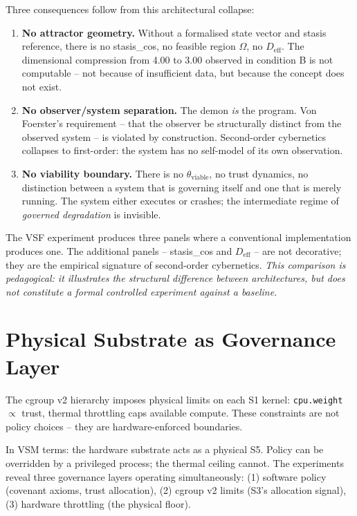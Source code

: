 \documentclass[11pt, a4paper]{article}
\begin{document}
Three consequences follow from this architectural collapse:

\begin{enumerate}
  \item \textbf{No attractor geometry.}  Without a formalised state vector and
    stasis reference, there is no stasis\_cos, no feasible region $\Omega$,
    no $D_\text{eff}$.  The dimensional compression from 4.00 to 3.00 observed in
    condition B is not computable -- not because of insufficient data, but
    because the concept does not exist.
  \item \textbf{No observer/system separation.}  The demon \emph{is} the
    program.  Von Foerster's requirement -- that the observer be structurally
    distinct from the observed system -- is violated by construction.
    Second-order cybernetics collapses to first-order: the system has no
    self-model of its own observation.
  \item \textbf{No viability boundary.}  There is no $\theta_\text{viable}$,
    no trust dynamics, no distinction between a system that is governing itself
    and one that is merely running.  The system either executes or crashes;
    the intermediate regime of \emph{governed degradation} is invisible.
\end{enumerate}

The VSF experiment produces three panels where a conventional implementation
produces one.  The additional panels -- stasis\_cos and $D_\text{eff}$ -- are not
decorative; they are the empirical signature of second-order cybernetics.
\textit{This comparison is pedagogical: it illustrates the structural
difference between architectures, but does not constitute a formal
controlled experiment against a baseline.}

\section{Physical Substrate as Governance Layer}
\label{sec:substrate}

The cgroup v2 hierarchy imposes physical limits on each S1 kernel:
\texttt{cpu.weight} $\propto$ trust, thermal throttling caps available
compute.
These constraints are not policy choices -- they are hardware-enforced
boundaries.

In VSM terms: the hardware substrate acts as a physical S5.
Policy can be overridden by a privileged process; the thermal ceiling
cannot.
The experiments reveal three governance layers operating simultaneously:
(1) software policy (covenant axioms, trust allocation),
(2) cgroup v2 limits (S3's allocation signal),
(3) hardware throttling (the physical floor).
\end{document}
